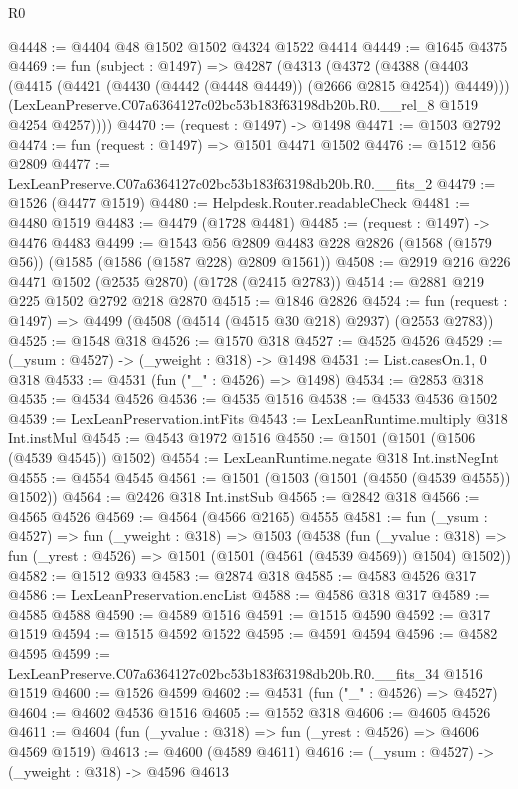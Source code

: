 \begin{lexlean}{R0}
\begin{coremodule}
@4448 := @4404 @48 @1502 @1502 @4324 @1522 @4414
@4449 := @1645 @4375
@4469 := fun (subject : @1497) =>
  @4287
    (@4313
      (@4372
        (@4388
          (@4403 (@4415 (@4421 (@4430 (@4442 (@4448 @4449)) (@2666 @2815 @4254)) @4449)))
          (LexLeanPreserve.C07a6364127c02bc53b183f63198db20b.R0.__rel_8 @1519 @4254 @4257))))
@4470 := (request : @1497) -> @1498
@4471 := @1503 @2792
@4474 := fun (request : @1497) => @1501 @4471 @1502
@4476 := @1512 @56 @2809
@4477 := LexLeanPreserve.C07a6364127c02bc53b183f63198db20b.R0.__fits_2
@4479 := @1526 (@4477 @1519)
@4480 := Helpdesk.Router.readableCheck
@4481 := @4480 @1519
@4483 := @4479 (@1728 @4481)
@4485 := (request : @1497) -> @4476 @4483
@4499 := @1543
    @56
    @2809
    @4483
    @228
    @2826
    (@1568 (@1579 @56))
    (@1585 (@1586 (@1587 @228) @2809 @1561))
@4508 := @2919 @216 @226 @4471 @1502 (@2535 @2870) (@1728 (@2415 @2783))
@4514 := @2881 @219 @225 @1502 @2792 @218 @2870
@4515 := @1846 @2826
@4524 := fun (request : @1497) => @4499 (@4508 (@4514 (@4515 @30 @218) @2937) (@2553 @2783))
@4525 := @1548 @318
@4526 := @1570 @318
@4527 := @4525 @4526
@4529 := (_ysum : @4527) -> (_yweight : @318) -> @1498
@4531 := List.casesOn.{1, 0} @318
@4533 := @4531 (fun ("_" : @4526) => @1498)
@4534 := @2853 @318
@4535 := @4534 @4526
@4536 := @4535 @1516
@4538 := @4533 @4536 @1502
@4539 := LexLeanPreservation.intFits
@4543 := LexLeanRuntime.multiply @318 Int.instMul
@4545 := @4543 @1972 @1516
@4550 := @1501 (@1501 (@1506 (@4539 @4545)) @1502)
@4554 := LexLeanRuntime.negate @318 Int.instNegInt
@4555 := @4554 @4545
@4561 := @1501 (@1503 (@1501 (@4550 (@4539 @4555)) @1502))
@4564 := @2426 @318 Int.instSub
@4565 := @2842 @318
@4566 := @4565 @4526
@4569 := @4564 (@4566 @2165) @4555
@4581 := fun (_ysum : @4527) =>
  fun (_yweight : @318) =>
  @1503
    (@4538
      (fun (_yvalue : @318) =>
      fun (_yrest : @4526) => @1501 (@1501 (@4561 (@4539 @4569)) @1504) @1502))
@4582 := @1512 @933
@4583 := @2874 @318
@4585 := @4583 @4526 @317
@4586 := LexLeanPreservation.encList
@4588 := @4586 @318 @317
@4589 := @4585 @4588
@4590 := @4589 @1516
@4591 := @1515 @4590
@4592 := @317 @1519
@4594 := @1515 @4592 @1522
@4595 := @4591 @4594
@4596 := @4582 @4595
@4599 := LexLeanPreserve.C07a6364127c02bc53b183f63198db20b.R0.__fits_34 @1516 @1519
@4600 := @1526 @4599
@4602 := @4531 (fun ("_" : @4526) => @4527)
@4604 := @4602 @4536 @1516
@4605 := @1552 @318
@4606 := @4605 @4526
@4611 := @4604 (fun (_yvalue : @318) => fun (_yrest : @4526) => @4606 @4569 @1519)
@4613 := @4600 (@4589 @4611)
@4616 := (_ysum : @4527) -> (_yweight : @318) -> @4596 @4613

\end{coremodule}
\end{lexlean}
